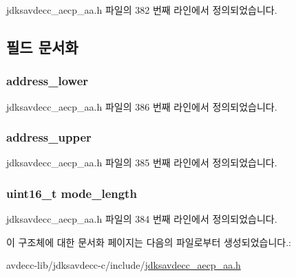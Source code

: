 jdksavdecc\+\_\+aecp\+\_\+aa.\+h 파일의 382 번째 라인에서 정의되었습니다.



\subsection{필드 문서화}
\subsubsection[{\texorpdfstring{address\+\_\+lower}{address_lower}}]{ address\+\_\+lower}\hypertarget{structjdksavdecc__aecp__aa__tlv_ac321f0e93cb752462e777998c2342240}{}\label{structjdksavdecc__aecp__aa__tlv_ac321f0e93cb752462e777998c2342240}


jdksavdecc\+\_\+aecp\+\_\+aa.\+h 파일의 386 번째 라인에서 정의되었습니다.

\subsubsection[{\texorpdfstring{address\+\_\+upper}{address_upper}}]{ address\+\_\+upper}\hypertarget{structjdksavdecc__aecp__aa__tlv_ab0df98b893a141626b459c7b2044f8a7}{}\label{structjdksavdecc__aecp__aa__tlv_ab0df98b893a141626b459c7b2044f8a7}


jdksavdecc\+\_\+aecp\+\_\+aa.\+h 파일의 385 번째 라인에서 정의되었습니다.

\subsubsection[{\texorpdfstring{mode\+\_\+length}{mode_length}}]{\setlength{\rightskip}{0pt plus 5cm}uint16\+\_\+t mode\+\_\+length}\hypertarget{structjdksavdecc__aecp__aa__tlv_aa411bf53df719d8cdbc9ee46e087ef94}{}\label{structjdksavdecc__aecp__aa__tlv_aa411bf53df719d8cdbc9ee46e087ef94}


jdksavdecc\+\_\+aecp\+\_\+aa.\+h 파일의 384 번째 라인에서 정의되었습니다.



이 구조체에 대한 문서화 페이지는 다음의 파일로부터 생성되었습니다.\+:\begin{DoxyCompactItemize}
\item 
avdecc-\/lib/jdksavdecc-\/c/include/\hyperlink{jdksavdecc__aecp__aa_8h}{jdksavdecc\+\_\+aecp\+\_\+aa.\+h}\end{DoxyCompactItemize}
